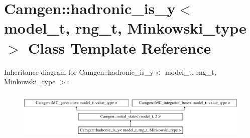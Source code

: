 \hypertarget{a00263}{}\section{Camgen\+:\+:hadronic\+\_\+is\+\_\+y$<$ model\+\_\+t, rng\+\_\+t, Minkowski\+\_\+type $>$ Class Template Reference}
\label{a00263}
Inheritance diagram for Camgen\+:\+:hadronic\+\_\+is\+\_\+y$<$ model\+\_\+t, rng\+\_\+t, Minkowski\+\_\+type $>$\+:\begin{figure}[H]
\begin{center}
\leavevmode
\includegraphics[height=2.366197cm]{a00263}
\end{center}
\end{figure}
